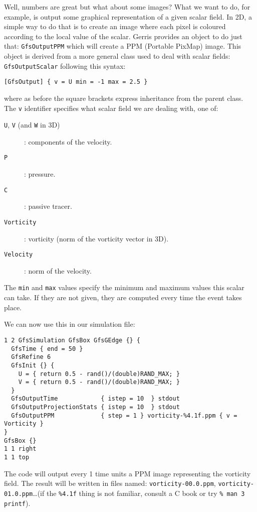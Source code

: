 \documentclass[a4paper]{article}
\begin{document}
Well, numbers are great but what about some images? What we want to 
do, for example, is output some graphical representation of a given
scalar field. In 2D, a simple way to do that is to create an image
where each pixel is coloured according to the local value of the
scalar. Gerris provides an object to do just that: {\tt GfsOutputPPM}
which will create a {\sc PPM} (Portable PixMap) image. This object is
derived from a more general class used to deal with scalar fields:
{\tt GfsOutputScalar} following this syntax:
\begin{verbatim}
[GfsOutput] { v = U min = -1 max = 2.5 }
\end{verbatim}
where as before the square brackets express inheritance from the
parent class. The {\tt v} identifier specifies what scalar field we
are dealing with, one of:
\begin{description}
\item[{\tt U}, {\tt V} (and {\tt W} in 3D)]: components of the velocity.
\item[{\tt P}]: pressure.
\item[{\tt C}]: passive tracer.
\item[{\tt Vorticity}]: vorticity (norm of the vorticity vector in 3D).
\item[{\tt Velocity}]: norm of the velocity.
\end{description}
The {\tt min} and {\tt max} values specify the minimum and maximum
values this scalar can take. If they are not given, they are computed
every time the event takes place.

We can now use this in our simulation file:
\begin{verbatim}
1 2 GfsSimulation GfsBox GfsGEdge {} {
  GfsTime { end = 50 }
  GfsRefine 6
  GfsInit {} {
    U = { return 0.5 - rand()/(double)RAND_MAX; }
    V = { return 0.5 - rand()/(double)RAND_MAX; }
  }  
  GfsOutputTime            { istep = 10  } stdout
  GfsOutputProjectionStats { istep = 10  } stdout
  GfsOutputPPM             { step = 1 } vorticity-%4.1f.ppm { v = Vorticity }
}
GfsBox {}
1 1 right
1 1 top
\end{verbatim}
The code will output every 1 time units a {\sc PPM} image
representing the vorticity field. The result will be written in files 
named: {\tt vorticity-00.0.ppm}, {\tt vorticity-01.0.ppm}\dots (if the 
{\tt \%4.1f} thing is not familiar, consult a C book or try {\tt \% man 
3 printf}).
\end{document}
